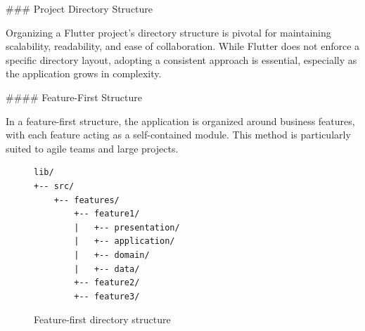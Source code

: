 \documentclass[
  digital,     %
  oneside,     %
  nosansbold,  %
  nocolorbold, %
  lof,         %
  lot,         %
]{fithesis4}
\begin{document}
\begin{markdown}
### Project Directory Structure

Organizing a Flutter project's directory structure is pivotal for maintaining scalability, readability, and ease of collaboration. While Flutter does not enforce a specific directory layout, adopting a consistent approach is essential, especially as the application grows in complexity.

#### Feature-First Structure

In a feature-first structure, the application is organized around business features, with each feature acting as a self-contained module.  
This method is particularly suited to agile teams and large projects.

\end{markdown}
\begin{figure}[ht]
  \begin{center}
    \begin{minipage}{.8\textwidth}
      \begin{verbatim}
lib/
+-- src/
    +-- features/
        +-- feature1/
        |   +-- presentation/
        |   +-- application/
        |   +-- domain/
        |   +-- data/
        +-- feature2/
        +-- feature3/
      \end{verbatim}
    \end{minipage}
  \end{center}
  \caption{Feature-first directory structure}
  \label{fig:project_directory_feature_first}
\end{figure}
\end{document}
